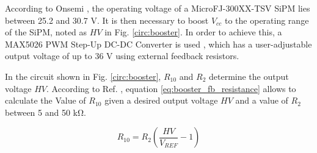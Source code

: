 According to Onsemi \cite{Onsemi_SiPM}, the operating voltage of a MicroFJ-300XX-TSV SiPM lies between 25.2 and 30.7 V. It is then necessary to boost $V_{cc}$ to the operating range of the SiPM, noted as $HV$ in Fig. \ref{circ:booster}. In order to achieve this, a MAX5026 PWM Step-Up DC-DC Converter is used \cite{AnalogDevices_DC_DC}, which has a user-adjustable output voltage of up to 36 V using external feedback resistors.

In the circuit shown in Fig. \ref{circ:booster}, $R_{10}$ and $R_2$ determine the output voltage $HV$. According to Ref. \cite{AnalogDevices_DC_DC}, equation \eqref{eq:booster_fb_resistance} allows to calculate the Value of $R_{10}$ given a desired output voltage $HV$ and a value of $R_2$ between 5 and 50 \unit{\kilo\ohm}.

\begin{equation}
    R_{10} = R_2\left(\frac{HV}{V_{REF}}-1\right) \label{eq:booster_fb_resistance}
\end{equation}